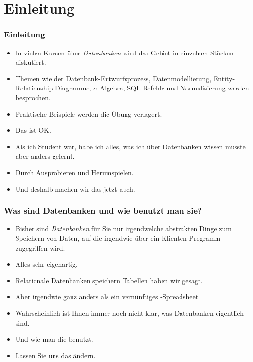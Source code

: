 \documentclass[aspectratio=169,mathserif,notheorems]{beamer}%
\subtitle{8.~Fabrik-Datenbank:~Benutzer und Datenbank}%
\begin{document}
%
%
\startPresentation%
%
\section{Einleitung}%
%
\begin{frame}%
\frametitle{Einleitung}%
\begin{itemize}%
\item In vielen Kursen über \emph{Datenbanken} wird das Gebiet in einzelnen Stücken diskutiert.%
\item<2-> Themen wie der Datenbank-Entwurfsprozess, Datenmodellierung, Entity-Relationship-Diagramme, $\sigma$\nobreakdashes-Algebra, SQL\nobreakdashes-Befehle und Normalisierung werden besprochen.%
\item<3-> Praktische Beispiele werden die Übung verlagert.%
\item<4-> Das ist OK.%
\item<5-> Als ich Student war, habe ich alles, was ich über Datenbanken wissen musste aber anders gelernt.%
\item<6-> Durch Ausprobieren und Herumspielen.%
\item<7-> Und deshalb machen wir das jetzt auch.%
\end{itemize}%
\end{frame}%
%
\begin{frame}%
\frametitle{Was sind Datenbanken und wie benutzt man sie?}%
\begin{itemize}%
\item Bisher sind \emph{Datenbanken} für Sie nur irgendwelche abstrakten Dinge zum Speichern von Daten, auf die irgendwie über ein Klienten-Programm zugegriffen wird.%
\item<2-> Alles sehr eigenartig.%
\item<3-> Relationale Datenbanken speichern Tabellen haben wir gesagt.%
\item<4-> Aber irgendwie ganz anders als ein vernünftiges \microsoftExcel-Spreadsheet.%
\item<5-> Wahrscheinlich ist Ihnen immer noch nicht klar, was Datenbanken eigentlich sind.%
\item<6-> Und wie man die benutzt.%
\item<7-> Lassen Sie uns das ändern.%
\end{itemize}%
\end{frame}%
%
\end{document}
